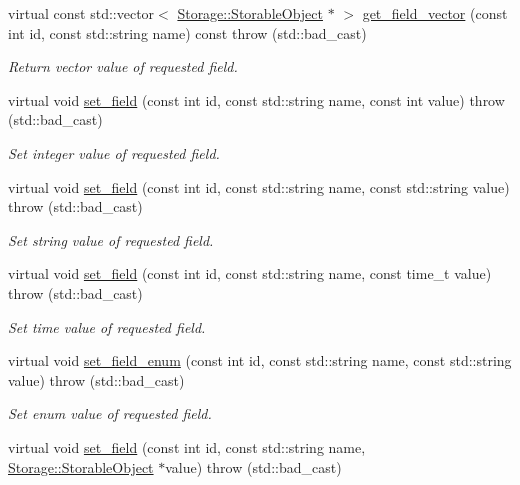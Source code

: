 \begin{DoxyCompactItemize}
virtual const std::vector$<$ \hyperlink{classStorage_1_1StorableObject}{Storage::StorableObject} $\ast$ $>$ \hyperlink{classSQLiteStorage_a818cc8edbbe849eabacbdc055a32ad6a}{get\_\-field\_\-vector} (const int id, const std::string name) const   throw (std::bad\_\-cast)
\begin{DoxyCompactList}\small\item\em Return vector value of requested field. \item\end{DoxyCompactList}\item 
virtual void \hyperlink{classSQLiteStorage_a3e1271c2699a0e5a82452a21e5d1af63}{set\_\-field} (const int id, const std::string name, const int value)  throw (std::bad\_\-cast)
\begin{DoxyCompactList}\small\item\em Set integer value of requested field. \item\end{DoxyCompactList}\item 
virtual void \hyperlink{classSQLiteStorage_ac353c289df54fce5f5658746824fcbac}{set\_\-field} (const int id, const std::string name, const std::string value)  throw (std::bad\_\-cast)
\begin{DoxyCompactList}\small\item\em Set string value of requested field. \item\end{DoxyCompactList}\item 
virtual void \hyperlink{classSQLiteStorage_a36665e18b5290da4c7bab56d22703d03}{set\_\-field} (const int id, const std::string name, const time\_\-t value)  throw (std::bad\_\-cast)
\begin{DoxyCompactList}\small\item\em Set time value of requested field. \item\end{DoxyCompactList}\item 
virtual void \hyperlink{classSQLiteStorage_a1b8a3f2ad138447ad5815e857eea333e}{set\_\-field\_\-enum} (const int id, const std::string name, const std::string value)  throw (std::bad\_\-cast)
\begin{DoxyCompactList}\small\item\em Set enum value of requested field. \item\end{DoxyCompactList}\item 
virtual void \hyperlink{classSQLiteStorage_ab2b3d9fcde8dbcd28eb66f60a6cf13ac}{set\_\-field} (const int id, const std::string name, \hyperlink{classStorage_1_1StorableObject}{Storage::StorableObject} $\ast$value)  throw (std::bad\_\-cast)

\end{DoxyCompactItemize}
